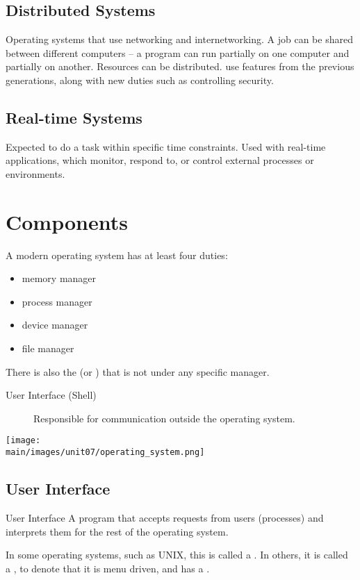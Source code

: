 \documentclass[\main/notes.tex]{subfiles}
\begin{document}
			\subsection{Distributed Systems}
				Operating systems that use networking and internetworking. A job can be shared between different computers -- a program can run partially on one computer and partially on another. Resources can be distributed.  use features from the previous generations, along with new duties such as controlling security.
			\subsection{Real-time Systems}
				Expected to do a task within specific time constraints. Used with real-time applications, which monitor, respond to, or control external processes or environments.

		\section{Components}
			A modern operating system has at least four duties:
			\begin{indentparagraph}
				\begin{itemize}
					\item memory manager
					\item process manager
					\item device manager
					\item file manager
				\end{itemize}
			\end{indentparagraph}
			There is also the  (or ) that is not under any specific manager.
			\begin{indentparagraph}
				\begin{description}
					\item[User Interface (Shell)] Responsible for communication outside the operating system.
				\end{description}
			\end{indentparagraph}
			\begin{center}
				\texttt{[image: \\main/images/unit07/operating\_system.png]}
			\end{center}
			\subsection{User Interface}
				\begin{definition}{User Interface}
					A program that accepts requests from users (processes) and interprets them for the rest of the operating system.

					In some operating systems, such as UNIX, this is called a . In others, it is called a , to denote that it is menu driven, and has a .
				\end{definition}
			\pagebreak
\end{document}
